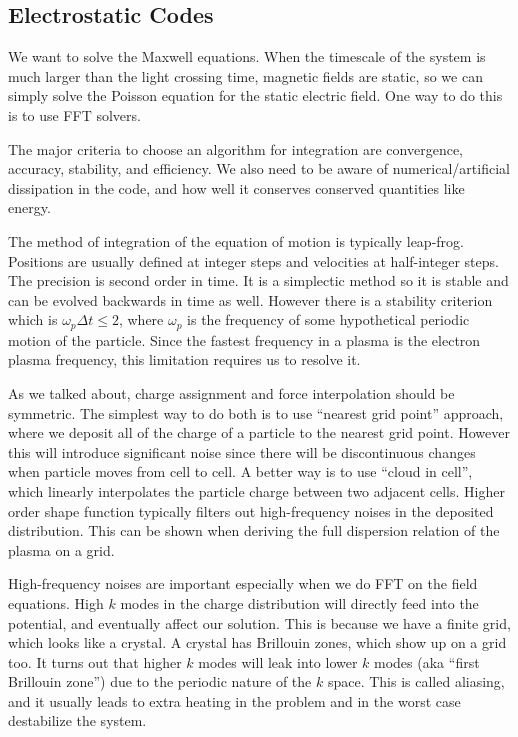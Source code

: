 \documentclass[letterpaper, 11pt]{article}
\numberwithin{equation}{section}
\numberwithin{figure}{section}
\begin{document}
\subsection{Electrostatic Codes}

We want to solve the Maxwell equations. When the timescale of the system is much
larger than the light crossing time, magnetic fields are static, so we can
simply solve the Poisson equation for the static electric field. One way to
do this is to use FFT solvers.

The major criteria to choose an algorithm for integration are convergence,
accuracy, stability, and efficiency. We also need to be aware of
numerical/artificial dissipation in the code, and how well it conserves
conserved quantities like energy.

The method of integration of the equation of motion is typically leap-frog.
Positions are usually defined at integer steps and velocities at half-integer
steps. The precision is second order in time. It is a simplectic method so it is
stable and can be evolved backwards in time as well. However there is a
stability criterion which is $\omega_p\Delta t \leq 2$, where $\omega_p$ is the
frequency of some hypothetical periodic motion of the particle. Since the
fastest frequency in a plasma is the electron plasma frequency, this limitation
requires us to resolve it.

As we talked about, charge assignment and force interpolation should be
symmetric. The simplest way to do both is to use ``nearest grid point''
approach, where we deposit all of the charge of a particle to the nearest grid
point. However this will introduce significant noise since there will be
discontinuous changes when particle moves from cell to cell. A better way is to
use ``cloud in cell'', which linearly interpolates the particle charge between
two adjacent cells. Higher order shape function typically filters out
high-frequency noises in the deposited distribution. This can be shown when
deriving the full dispersion relation of the plasma on a grid.

High-frequency noises are important especially when we do FFT on the field
equations. High $k$ modes in the charge distribution will directly feed into the
potential, and eventually affect our solution. This is because we have a finite
grid, which looks like a crystal. A crystal has Brillouin zones, which show up
on a grid too. It turns out that higher $k$ modes will leak into lower $k$ modes
(aka ``first Brillouin zone'') due to the periodic nature of the $k$ space. This
is called aliasing, and it usually leads to extra heating in the problem and in
the worst case destabilize the system.
\end{document}
